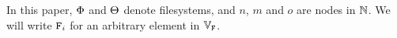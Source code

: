 % 
% 

In this paper, $\Phi$ and $\Theta$ denote filesystems,
and $n$, $m$ and $o$ are nodes in $\mathbb{N}$.
We will write $\mathtt{F}_i$ for an arbitrary element in $\mathbb{V}_{\mathtt{F}}$.

